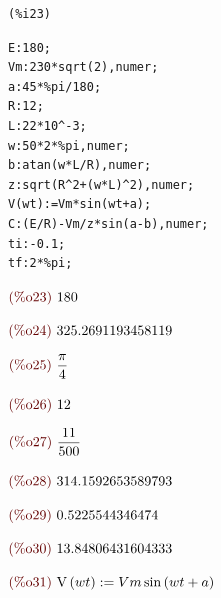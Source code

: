 \documentclass{article}
\begin{document}
\noindent
\begin{minipage}[t]{8ex}{\color{red}\bf
\begin{verbatim}
(%i23) 
\end{verbatim}}
\end{minipage}
\begin{minipage}[t]{\textwidth}{\color{blue}
\begin{verbatim}
E:180;
Vm:230*sqrt(2),numer;
a:45*%pi/180;
R:12;
L:22*10^-3;
w:50*2*%pi,numer;
b:atan(w*L/R),numer;
z:sqrt(R^2+(w*L)^2),numer;
V(wt):=Vm*sin(wt+a);
C:(E/R)-Vm/z*sin(a-b),numer;
ti:-0.1;
tf:2*%pi;
\end{verbatim}}
\end{minipage}
\begin{math}\displaystyle
\parbox{8ex}{\color{labelcolor}(\%o23) }
180
\end{math}

\begin{math}\displaystyle
\parbox{8ex}{\color{labelcolor}(\%o24) }
325.2691193458119
\end{math}

\begin{math}\displaystyle
\parbox{8ex}{\color{labelcolor}(\%o25) }
\frac{\pi }{4}
\end{math}

\begin{math}\displaystyle
\parbox{8ex}{\color{labelcolor}(\%o26) }
12
\end{math}

\begin{math}\displaystyle
\parbox{8ex}{\color{labelcolor}(\%o27) }
\frac{11}{500}
\end{math}

\begin{math}\displaystyle
\parbox{8ex}{\color{labelcolor}(\%o28) }
314.1592653589793
\end{math}

\begin{math}\displaystyle
\parbox{8ex}{\color{labelcolor}(\%o29) }
0.5225544346474
\end{math}

\begin{math}\displaystyle
\parbox{8ex}{\color{labelcolor}(\%o30) }
13.84806431604333
\end{math}

\begin{math}\displaystyle
\parbox{8ex}{\color{labelcolor}(\%o31) }
\mathrm{V}\left( wt\right) :=Vm\,\mathrm{sin}\left( wt+a\right) 
\end{math}
\end{document}
